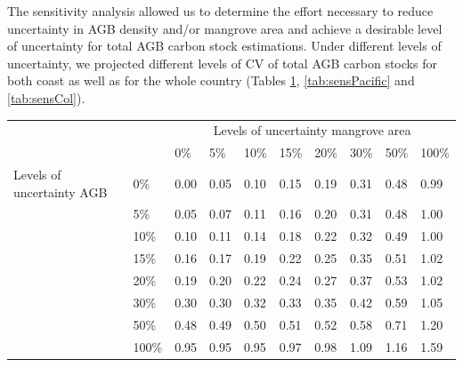 \documentclass[review, authoryear]{elsarticle}   	%
\begin{document}
The sensitivity analysis allowed us to determine the effort necessary to reduce uncertainty in AGB density and/or mangrove area and achieve a desirable level of uncertainty for total AGB carbon stock estimations. Under different levels of uncertainty, we projected different levels of CV of total AGB carbon stocks for both coast as well as for the whole country (Tables \ref{tab:sensCaribbean}, \ref{tab:sensPacific} and \ref{tab:sensCol}). 

\begin{table}[htbp]
   \centering
   \begin{tabular}{p{2.0cm}p{1.0cm}p{1.0cm}p{1.0cm}p{1.0cm}p{1.0cm}p{1.0cm}p{1.0cm}p{1.0cm}p{1.0cm}} %
      \toprule
        &&\multicolumn{8}{c}{Levels of uncertainty mangrove area}\\      
      &&0\%&5\%&10\%&15\%&20\%&30\%&50\%&100\%\\
            \midrule 
Levels of uncertainty AGB&0\%&0.00&0.05&0.10&0.15&0.19&0.31&0.48&0.99\\ 
      &5\%&0.05&0.07&0.11&0.16&0.20&0.31&0.48&1.00\\
     &10\%&0.10&0.11&0.14&0.18&0.22&0.32&0.49&1.00\\
      &15\%&0.16&0.17&0.19&0.22&0.25&0.35&0.51&1.02 \\
      &20\%&0.19&0.20&0.22&0.24&0.27&0.37&0.53&1.02\\
     &30\%&0.30&0.30&0.32&0.33&0.35&0.42&0.59&1.05\\
 &50\%&0.48&0.49&0.50&0.51&0.52&0.58&0.71&1.20\\
     &100\%&0.95&0.95&0.95&0.97&0.98&1.09&1.16&1.59\\
               \bottomrule
   \end{tabular}
   \label{tab:sensCaribbean}
\end{table}
\end{document}
